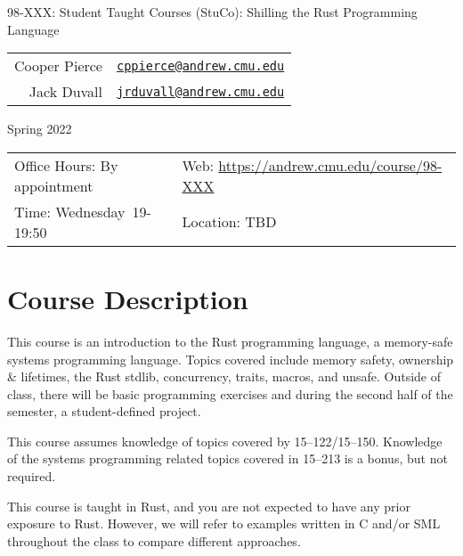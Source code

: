 \documentclass{article}
\newcommand{\longcoursename}{
    Student Taught Courses (StuCo): Shilling the Rust Programming Language
}
\newcommand{\courselocation}{TBD}
\newcommand{\meetingstarttime}{19}
\newcommand{\meetingendtime}{19:50}
\newcommand{\meetingdays}{Wednesday}
\newcommand{\longsemester}{Spring 2022}
\newcommand{\deptcode}{98}
\newcommand{\coursecode}{XXX}
\newcommand{\fullcoursecode}{\deptcode-\coursecode}
\begin{document}
\thispagestyle{empty}
\begin{center}
\begin{minipage}{.85\textwidth}
    \centering
    {\huge {\fullcoursecode: \longcoursename}}

    \vspace{1em}

    \begin{tabular}{@{}rl@{}}
        Cooper Pierce & \href{mailto:cppierce@andrew.cmu.edu}{\texttt{cppierce@andrew.cmu.edu}} \\ 
        Jack Duvall & \href{mailto:jrduvall@andrew.cmu.edu}{\texttt{jrduvall@andrew.cmu.edu}} \\
    \end{tabular}

    \vspace{1em}

    \longsemester
\end{minipage}
\end{center}

\vspace{3em}


\begin{tabular*}{.93\textwidth}{@{\extracolsep{\fill}}ll}
    \toprule
    Office Hours: By appointment & Web: \url{https://andrew.cmu.edu/course/\fullcoursecode} \\
    Time: \meetingdays\ \meetingstarttime-\meetingendtime & Location: \courselocation \\
    \bottomrule
\end{tabular*}

\vspace{5em}

\section*{Course Description}

This course is an introduction to the Rust programming language, a memory-safe
systems programming language. Topics covered include memory safety, ownership \&
lifetimes, the Rust stdlib, concurrency, traits, macros, and unsafe. Outside of
class, there will be basic programming exercises and during the second half of
the semester, a student-defined project.

This course assumes knowledge of topics covered by 15--122/15--150. Knowledge of
the systems programming related topics covered in 15--213 is a bonus, but not
required.

This course is taught in Rust, and you are not expected to have any prior
exposure to Rust. However, we will refer to examples written in C and/or SML
throughout the class to compare different approaches.
\end{document}
